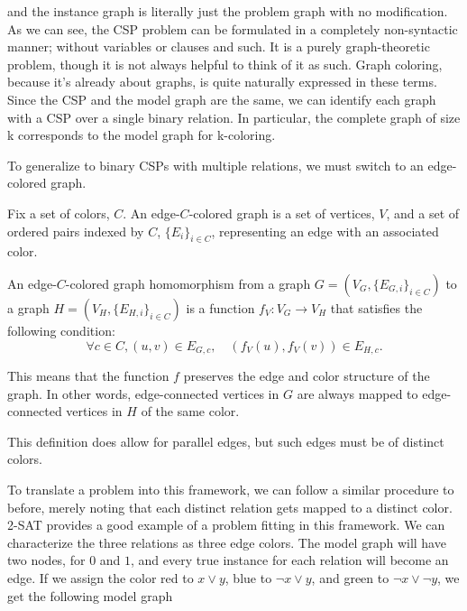 \begin{center}
\end{center}


and the instance graph is literally just the problem graph with no modification. As we can see, the CSP problem can be formulated in a completely non-syntactic manner; without variables or clauses and such. It is a purely graph-theoretic problem, though it is not always helpful to think of it as such. Graph coloring, because it's already about graphs, is quite naturally expressed in these terms. Since the CSP and the model graph are the same, we can identify each graph with a CSP over a single binary relation. In particular, the complete graph of size k corresponds to the model graph for k-coloring.

To generalize to binary CSPs with multiple relations, we must switch to an edge-colored graph. 

\begin{definition}
Fix a set of colors, $C$. An edge-$C$-colored graph is a set of vertices, $V$, and a set of ordered pairs indexed by $C$, $\{E_i\}_{i\in C}$, representing an edge with an associated color. 
\end{definition}

\begin{definition}
An edge-$C$-colored graph homomorphism from a graph $G = (V_G, \{E_{G,i}\}_{i\in C})$ to a graph $H = (V_H, \{E_{H, i}\}_{i\in C})$ is a function $f_V: V_G \rightarrow V_H$ that satisfies the following condition:
\begin{equation}
    \forall c \in C, (u, v) \in E_{G, c}, \quad (f_V(u), f_V(v)) \in E_{H, c}.    
\end{equation}    
\end{definition}

This means that the function $f$ preserves the edge and color structure of the graph. In other words, edge-connected vertices in $G$ are always mapped to edge-connected vertices in $H$ of the same color.

This definition does allow for parallel edges, but such edges must be of distinct colors.

To translate a problem into this framework, we can follow a similar procedure to before, merely noting that each distinct relation gets mapped to a distinct color. 2-SAT provides a good example of a problem fitting in this framework. We can characterize the three relations as three edge colors. The model graph will have two nodes, for $0$ and $1$, and every true instance for each relation will become an edge. If we assign the color red to $x \vee y$, blue to $\neg x \vee y$, and green to $\neg x \vee \neg y$, we get the following model graph

